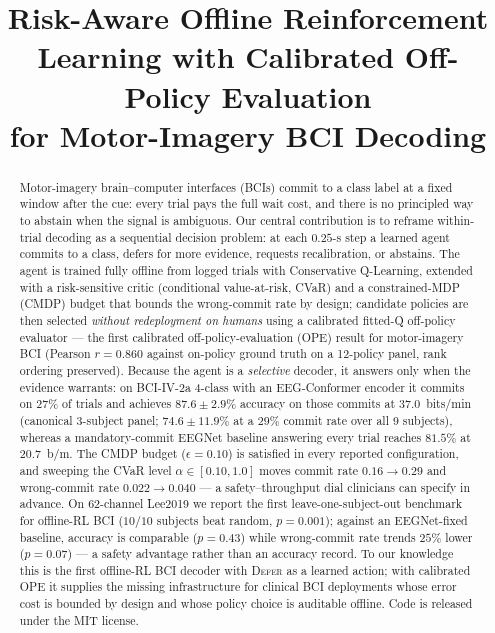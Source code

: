\documentclass[conference]{IEEEtran}
\newcommand{\bcia}{BCI-IV-2a}
\begin{document}
\title{Risk-Aware Offline Reinforcement Learning with Calibrated Off-Policy Evaluation\\for Motor-Imagery BCI Decoding}

\author{
}

\maketitle

\begin{abstract}
Motor-imagery brain--computer interfaces (BCIs) commit to a class
label at a fixed window after the cue: every trial pays the full
wait cost, and there is no principled way to abstain when the
signal is ambiguous. Our central contribution is to reframe
within-trial decoding as a sequential decision problem: at each
$0.25$-s step a learned agent commits to a class, defers for more
evidence, requests recalibration, or abstains. The agent is
trained fully offline from logged trials with Conservative
Q-Learning, extended with a risk-sensitive critic (conditional
value-at-risk, CVaR) and a constrained-MDP (CMDP) budget that
bounds the wrong-commit rate by design; candidate policies are
then selected \emph{without redeployment on humans} using a
calibrated fitted-Q off-policy evaluator --- the first calibrated
off-policy-evaluation (OPE) result for motor-imagery BCI (Pearson
$r\!=\!0.860$ against on-policy ground truth on a 12-policy
panel, rank ordering preserved). Because the agent is a
\emph{selective} decoder, it answers only when the evidence
warrants: on \bcia{} 4-class with an EEG-Conformer encoder it
commits on $27\%$ of trials and achieves $87.6\!\pm\!2.9\%$
accuracy on those commits at $37.0$~bits/min (canonical 3-subject
panel; $74.6\!\pm\!11.9\%$ at a $29\%$ commit rate over all 9
subjects), whereas a mandatory-commit EEGNet baseline answering
every trial reaches $81.5\%$ at $20.7$~b/m. The CMDP budget
($\epsilon\!=\!0.10$) is satisfied in every reported
configuration, and sweeping the CVaR level
$\alpha\!\in\![0.10,1.0]$ moves commit rate $0.16\!\to\!0.29$ and
wrong-commit rate $0.022\!\to\!0.040$ --- a safety--throughput
dial clinicians can specify in advance. On 62-channel Lee2019 we
report the first leave-one-subject-out benchmark for offline-RL
BCI ($10/10$ subjects beat random, $p\!=\!0.001$); against an
EEGNet-fixed baseline, accuracy is comparable ($p\!=\!0.43$)
while wrong-commit rate trends $25\%$ lower ($p\!=\!0.07$) --- a
safety advantage rather than an accuracy record. To our knowledge
this is the first offline-RL BCI decoder with \textsc{Defer} as a
learned action; with calibrated OPE it supplies the missing
infrastructure for clinical BCI deployments whose error cost is
bounded by design and whose policy choice is auditable offline.
Code is released under the MIT license.
\end{abstract}
\end{document}
